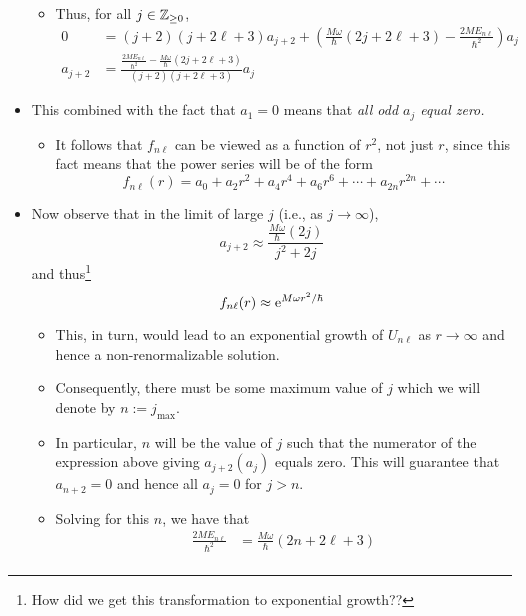 \documentclass[../notes.tex]{subfiles}
\begin{document}
\begin{itemize}
\begin{itemize}
        \item Thus, for all $j\in\Z_{\geq 0}$,
        \begin{align*}
            0 &= (j+2)(j+2\ell+3)a_{j+2}+\left( \frac{M\omega}{\hbar}(2j+2\ell+3)-\frac{2ME_{n\ell}}{\hbar^2} \right)a_j\\
            a_{j+2} &= \frac{\frac{2ME_{n\ell}}{\hbar^2}-\frac{M\omega}{\hbar}(2j+2\ell+3)}{(j+2)(j+2\ell+3)}a_j
        \end{align*}
    \end{itemize}
    \item This combined with the fact that $a_1=0$ means that \emph{all odd $a_j$ equal zero.}
    \begin{itemize}
        \item It follows that $f_{n\ell}$ can be viewed as a function of $r^2$, not just $r$, since this fact means that the power series will be of the form
        \begin{equation*}
            f_{n\ell}(r) = a_0+a_2r^2+a_4r^4+a_6r^6+\cdots+a_{2n}r^{2n}+\cdots
        \end{equation*}
    \end{itemize}
    \item Now observe that in the limit of large $j$ (i.e., as $j\to\infty$),
    \begin{equation*}
        a_{j+2} \approx \frac{\frac{M\omega}{\hbar}(2j)}{j^2+2j}
    \end{equation*}
    and thus\footnote{How did we get this transformation to exponential growth??}
    \begin{equation*}
        f_{n\ell}(r) \approx \e[M\omega r^2/\hbar]
    \end{equation*}
    \begin{itemize}
        \item This, in turn, would lead to an exponential growth of $U_{n\ell}$ as $r\to\infty$ and hence a non-renormalizable solution.
        \item Consequently, there must be some maximum value of $j$ which we will denote by $n:=j_\text{max}$.
        \item In particular, $n$ will be the value of $j$ such that the numerator of the expression above giving $a_{j+2}(a_j)$ equals zero. This will guarantee that $a_{n+2}=0$ and hence all $a_j=0$ for $j>n$.
        \item Solving for this $n$, we have that
        \begin{align*}
            \frac{2ME_{n\ell}}{\hbar^2} &= \frac{M\omega}{\hbar}(2n+2\ell+3)\\

\end{align*}
\end{itemize}
\end{itemize}
\end{document}
